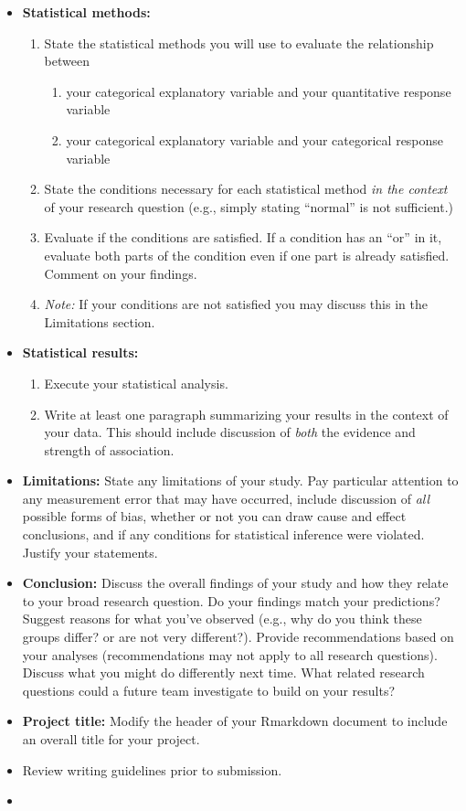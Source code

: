 \documentclass[letterpaper,12pt]{report}
\begin{document}
\begin{itemize}
    \item \textbf{Statistical methods:}
    \begin{enumerate}
    \item State the statistical methods you will use to evaluate the relationship between
    \begin{enumerate}
    \item your categorical explanatory variable and your quantitative response variable
    \item your categorical explanatory variable and your categorical response variable
    \end{enumerate}
    \item State the conditions necessary for each statistical method \emph{in the context} of your research question (e.g., simply stating ``normal'' is not sufficient.)
    \item Evaluate if the conditions are satisfied. If a condition has an ``or'' in it, evaluate both parts of the condition even if one part is already satisfied.  Comment on your findings.
    \item[] \emph{Note:} If your conditions are not satisfied you may discuss this in the Limitations section.
    \end{enumerate}
    \item \textbf{Statistical results:}
    \begin{enumerate}
    \item Execute your statistical analysis.
    \item Write at least one paragraph summarizing your results in the context of your data.  This should include discussion of \emph{both} the evidence and strength of association.
    \end{enumerate}
    \item \textbf{Limitations:}  State any limitations of your study.  Pay particular attention to any measurement error that may have occurred, include discussion of \emph{all} possible forms of bias, whether or not you can draw cause and effect conclusions, and if any conditions for statistical inference were violated.  Justify your statements.
    \item \textbf{Conclusion:}  Discuss the overall findings of your study and how they relate to your broad research question.  Do your findings match your predictions? Suggest reasons for what you've observed (e.g., why do you think these groups differ? or are not very different?).  Provide recommendations based on your analyses (recommendations may not apply to all research questions).  Discuss what you might do differently next time.  What related research questions could a future team investigate to build on your results?
    \item \textbf{Project title:} Modify the header of your Rmarkdown document to include an overall title for your project.
    \item {} Review writing guidelines prior to submission.
    \item[]
\end{itemize}
\end{document}
